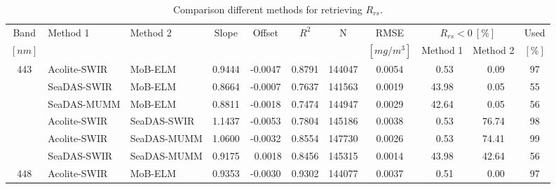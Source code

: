 \documentclass[]{spie}  %
\begin{document}
 
\begin{table}[!ht]
\caption{ Comparison different methods for retrieving $R_{rs}$. \label{tab:RrsCompMethod} } 
\centering
\scriptsize
\begin{tabular}{cllcccccccc} 
Band		&   Method 1      &  Method 2	  &	Slope  	&	Offset  &	$R^2 $  &	N      	&	RMSE    &\multicolumn{2}{c}{$R_{rs}<0~[\%]$}   &   Used 	 \\ 
$[nm]$		&	  		      &  		 	  &	  		&			&	   		&	     	&$[mg/m^3]$ & Method 1   	& Method 2  		   & $[\%]$		 \\	\hline \hline
\multirow{6}{*}{443}&Acolite-SWIR&MoB-ELM     &	0.9444 	&	-0.0047 &	0.8791 	&	144047  &	0.0054  &  ~0.53     	& ~0.09      		   &   97   	 \\
			&   SeaDAS-SWIR   &  MoB-ELM      &	0.8664 	&	-0.0007 &	0.7637 	&	141563  &	0.0019  &  43.98    	& ~0.05      		   &   55   	 \\
			&   SeaDAS-MUMM   &  MoB-ELM      &	0.8811 	&	-0.0018 &	0.7474 	&	144947  &	0.0029  &  42.64    	& ~0.05      		   &   56   	 \\
			&   Acolite-SWIR  &  SeaDAS-SWIR  &	1.1437 	&	-0.0053 &	0.7804 	&	145186  &	0.0038  &  ~0.53     	& 76.74     		   &   98   	 \\
			&   Acolite-SWIR  &  SeaDAS-MUMM  &	1.0600 	&	-0.0032 &	0.8554 	&	147730  &	0.0026  &  ~0.53     	& 74.41     		   &   99   	 \\
			&   SeaDAS-SWIR   &  SeaDAS-MUMM  &	0.9175 	&	~0.0018 &	0.8456 	&	145315  &	0.0014  &  43.98    	& 42.64     		   &   56   	 \\  \hline
\multirow{6}{*}{448}&Acolite-SWIR&MoB-ELM     &	0.9353 	&	-0.0030 &	0.9302 	&	144077  &	0.0037  &  ~0.51     	& ~0.00      		   &   97   	 \\

\end{tabular}
\end{table}
\end{document}
